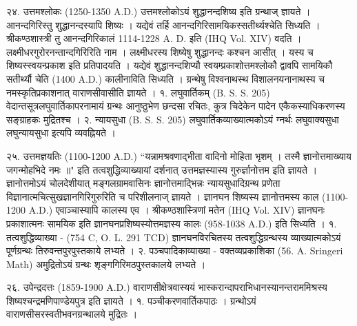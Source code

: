२४. उत्तमश्लोकः (1250-1350 A.D.)
उत्तमश्लोकोऽयं शुद्धानन्दशिष्य इति ग्रन्थाज् ज्ञायते । आनन्दगिरिस्तु शुद्धानन्दस्यापि शिष्यः । यद्येवं तर्हि आनन्दगिरिसामयिकस्सतीर्थ्यश्चेति सिध्यति । श्रीकण्ठशास्त्री तु आनन्दगिरिकालं 1114-1228 A. D. इति (IHQ Vol. XIV) वदति । लक्ष्मीधरगुरोरनन्तान्दगिरिरिति नाम । लक्ष्मीधरस्य शिष्येषु शुद्धानन्दः कश्चन आसीत् । यस्य च शिष्यस्स्वयन्प्रकाश इति प्रतिपादयति । यद्येवं शुद्धानन्दशिप्यौ स्वयम्प्रकाशोत्तमश्लोकौ द्वावपि सामयिकौ सतीर्थ्यौ चेति (1400 A.D.) कालीनाविति सिध्यति । ग्रन्थेषु विश्वनाथस्थ विशालनयनानाथस्य च नमस्कृतिप्रकाशनात् वाराणसीवासीति ज्ञायते ।
१. लघुवार्तिकम् (B. S. S. 205)
वेदान्तसूत्रलघुवार्तिकापरनामायं ग्रन्थः आनुष्ठुभेण छन्दसा रचितः, कुत्र चिदेकेन पादेन एकैकस्याधिकरणस्य सङ्ग्राहकः मुद्रितश्च ।
२. न्यायसुधा (B. S. S. 205)
लघुवार्तिकव्याख्यात्मकोऽयं ग्नर्थः लघुवाक्यसुधा लघुन्यायसुधा इत्यपि व्यवह्नियते ।

२५. उत्तमज्ञयतिः (1100-1200 A.D.)
``यन्नामश्रवणाद्भीता वादिनो मोहिता भृशम् ।
तस्मै ज्ञानोत्तमाख्याय जगन्मोहभिदे नमः ॥"
इति तत्वशुद्धिव्याख्यायां दर्शनात् उत्तमज्ञस्यास्य गुरुर्ज्ञानोत्तम इति ज्ञायते । ज्ञानोत्तमोऽयं चोलदेशीयात् मङ्गलग्रामवासिनः ज्ञानोत्तमाद्भिन्नः न्यायसुधादिग्रन्थ प्रणेता विज्ञानात्मचित्सुखज्ञानगिरिगुरुरिति च परिशीलनाज् ज्ञायते । ज्ञानघन शिष्यस्य ज्ञानोत्तमस्य काल (1100-1200 A.D.) एवाञ्चास्यापि कालस्य एव ।
श्रीकण्ठशास्त्रिणां मतेन (IHQ Vol. XIV) ज्ञानघनः प्रकाशात्मनः सामयिक इति ज्ञानघनप्रशिष्यस्योत्तमज्ञस्य कालः (958-1038 A.D.) इति सिध्यति ।
१. तत्वशुद्धिव्याख्या - (754 C, O. L. 291 TCD) ज्ञानघनविरचितस्य तत्वशुद्धिग्रन्थस्य व्याख्यात्मकोऽयं पूर्णग्रन्थः तिरुवन्तपुरपुस्तकाये लभ्यते ।
२. पञ्चपादिकाव्याख्या - वक्तव्यप्रकाशिका (56. A. Sringeri Math) अमुद्रितोऽयं ग्रन्थः शृङ्गगिरिमठपुस्तकालये लभ्यते ।

२६. उपेन्द्रदत्तः (1859-1900 A.D.)
वाराणसीक्षेत्रवास्ययं भास्करान्दापराभिधानस्यानन्तराममिश्रस्य शिष्यश्चन्द्रमणिपाण्डेयपुत्र इति ज्ञायते ।
१. पञ्चीकरणवार्तिकपाठः । ग्रन्थोऽयं वाराणसीसरस्वतीभवनग्रन्थालये मुद्रितः ।

